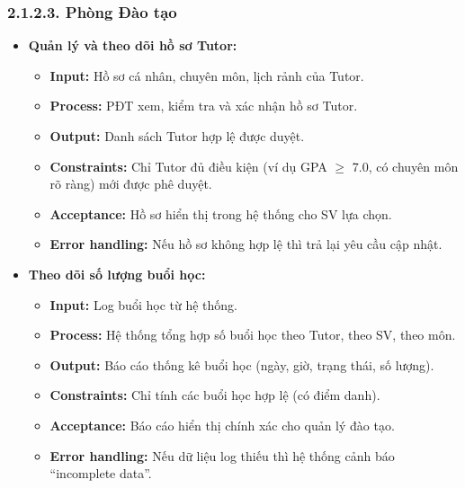 \subsubsection*{2.1.2.3. Phòng Đào tạo}
\begin{itemize}
    \item \textbf{Quản lý và theo dõi hồ sơ Tutor:}
    \begin{itemize}
        \item \textbf{Input:} Hồ sơ cá nhân, chuyên môn, lịch rảnh của Tutor.
        \item \textbf{Process:} PĐT xem, kiểm tra và xác nhận hồ sơ Tutor.
        \item \textbf{Output:} Danh sách Tutor hợp lệ được duyệt.
        \item \textbf{Constraints:} Chỉ Tutor đủ điều kiện (ví dụ GPA $\geq$ 7.0, có chuyên môn rõ ràng) mới được phê duyệt.
        \item \textbf{Acceptance:} Hồ sơ hiển thị trong hệ thống cho SV lựa chọn.
        \item \textbf{Error handling:} Nếu hồ sơ không hợp lệ thì trả lại yêu cầu cập nhật.
    \end{itemize}

    \item \textbf{Theo dõi số lượng buổi học:}
    \begin{itemize}
        \item \textbf{Input:} Log buổi học từ hệ thống.
        \item \textbf{Process:} Hệ thống tổng hợp số buổi học theo Tutor, theo SV, theo môn.
        \item \textbf{Output:} Báo cáo thống kê buổi học (ngày, giờ, trạng thái, số lượng).
        \item \textbf{Constraints:} Chỉ tính các buổi học hợp lệ (có điểm danh).
        \item \textbf{Acceptance:} Báo cáo hiển thị chính xác cho quản lý đào tạo.
        \item \textbf{Error handling:} Nếu dữ liệu log thiếu thì hệ thống cảnh báo “incomplete data”.
    \end{itemize}


\end{itemize}

